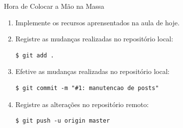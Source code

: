 \begin{frame}{Hora de Colocar a Mão na Massa}
	\begin{enumerate}
		\item Implemente os recursos aprensentados na aula de hoje.		
		\item Registre as mudanças realizadas no repositório local:
		\begin{lstlisting}[style=BashInputBasicStyle]
			$ git add .
		\end{lstlisting}

        \item Efetive as mudanças realizadas no repositório local:  		
        \begin{lstlisting}[style=BashInputBasicStyle]
			$ git commit -m "#1: manutencao de posts"
		\end{lstlisting}

		\item Registre as alterações no repositório remoto:
		\begin{lstlisting}[style=BashInputBasicStyle]
			$ git push -u origin master
		\end{lstlisting}
	\end{enumerate}
\end{frame}
